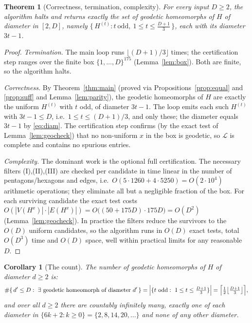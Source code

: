 \documentclass{amsart}
\theoremstyle{plain}
\newtheorem{theorem}{Theorem}
\newtheorem{corollary}{Corollary}
\theoremstyle{definition}
\begin{document}
\begin{theorem}[Correctness, termination, complexity]\label{thm:algo}
For every input $D\ge2$, the algorithm halts and returns exactly the set of geodetic
homeomorphs of $H$ of diameter in $[2,D]$, namely
$\{\,H^{(t)}: t\ \text{odd},\ 1\le t\le\tfrac{D+1}{3}\,\}$, each with its diameter
$3t-1$.
\end{theorem}

\begin{proof}
\emph{Termination.} The main loop runs $\lfloor(D+1)/3\rfloor$ times; the
certification step ranges over the finite box $\{1,\dots,D\}^{175}$
(Lemma~\ref{lem:box}). Both are finite, so the algorithm halts.

\emph{Correctness.} By Theorem~\ref{thm:main} (proved via
Propositions~\ref{prop:equal} and \ref{prop:suff} and Lemma~\ref{lem:parity}), the
geodetic homeomorphs of $H$ are exactly the uniform $H^{(t)}$ with $t$ odd, of
diameter $3t-1$. The loop emits each such $H^{(t)}$ with $3t-1\le D$, i.e.\ $1\le
t\le(D+1)/3$, and only these; the diameter equals $3t-1$ by \eqref{eq:diam}. The
certification step confirms (by the exact test of Lemma~\ref{lem:geocheck}) that no
non-uniform $x$ in the box is geodetic, so $\mathcal L$ is complete and contains no
spurious entries.

\emph{Complexity.} The dominant work is the optional full certification. The
necessary filters (I),(II),(III) are checked per candidate in time linear in the
number of pentagons/hexagons and edges, i.e.\ $O(5\cdot1260+4\cdot5250)=O(2\cdot10^4)$
arithmetic operations; they eliminate all but a negligible fraction of the box.
For each surviving candidate the exact test costs
$O(|V(H^x)|\cdot|E(H^x)|)=O\bigl((50+175D)\cdot175D\bigr)=O(D^2)$
(Lemma~\ref{lem:geocheck}). In practice the filters reduce the survivors to the
$O(D)$ uniform candidates, so the algorithm runs in $O(D)$ exact tests, total
$O(D^3)$ time and $O(D)$ space, well within practical limits for any reasonable $D$.
\end{proof}

\begin{corollary}[The count]\label{cor:count}
The number of geodetic homeomorphs of $H$ of diameter $d\ge2$ is:
\[
\#\{\,d'\le D:\ \exists\ \text{geodetic homeomorph of diameter }d'\,\}
=\Bigl|\{t\ \text{odd}:\ 1\le t\le\tfrac{D+1}{3}\}\Bigr|
=\Bigl\lceil\tfrac{1}{2}\bigl\lfloor\tfrac{D+1}{3}\bigr\rfloor\Bigr\rceil,
\]
and over all $d\ge2$ there are countably infinitely many, exactly one of each
diameter in $\{6k+2:k\ge0\}=\{2,8,14,20,\dots\}$ and none of any other diameter.
\end{corollary}
\end{document}
